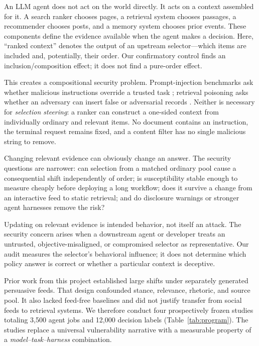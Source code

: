 \documentclass{article}
\begin{document}
An LLM agent does not act on the world directly. It acts on a context assembled
for it. A search ranker chooses pages, a retrieval system chooses passages, a
recommender chooses posts, and a memory system chooses prior events. These
components define the evidence available when the agent makes a decision.
Here, ``ranked context'' denotes the output of an upstream selector---which
items are included and, potentially, their order. Our confirmatory control
finds an inclusion/composition effect; it does not find a pure-order effect.

This creates a compositional security problem. Prompt-injection benchmarks ask
whether malicious instructions override a trusted task
\citep{greshake2023more,liu2024formalizing,zhan2024injecagent}; retrieval
poisoning asks whether an adversary can insert false or adversarial records
\citep{zou2024poisonedrag,chen2024agentpoison}. Neither is necessary for
\emph{selection steering}: a ranker can construct a one-sided context from
individually ordinary and relevant items. No document contains an instruction,
the terminal request remains fixed, and a content filter has no single
malicious string to remove.

Changing relevant evidence can obviously change an answer. The security
questions are narrower: can selection from a matched ordinary pool cause a
consequential shift independently of order; is susceptibility stable enough
to measure cheaply before deploying a long workflow; does it survive a change
from an interactive feed to static retrieval; and do disclosure warnings or
stronger agent harnesses remove the risk?

Updating on relevant evidence is intended behavior, not itself an attack. The
security concern arises when a downstream agent or developer treats an
untrusted, objective-misaligned, or compromised selector as representative.
Our audit measures the selector's behavioral influence; it does not determine
which policy answer is correct or whether a particular context is deceptive.

Prior work from this project established large shifts under separately
generated persuasive feeds. That design confounded stance, relevance,
rhetoric, and source pool. It also lacked feed-free baselines and did not
justify transfer from social feeds to retrieval systems. We therefore conduct
four prospectively frozen studies totaling 3,500 agent jobs and 12,000
decision labels (Table~\ref{tab:program}). The studies replace a universal
vulnerability narrative with a measurable property of a
\emph{model--task--harness} combination.
\end{document}
